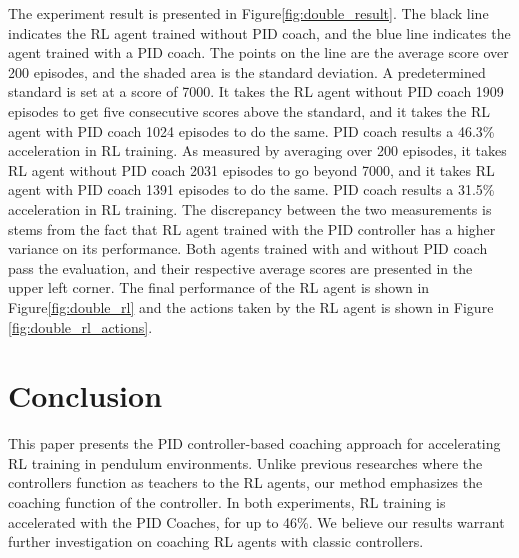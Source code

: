 \documentclass{IJCAS}
\begin{document}
The experiment result is presented in Figure\ref{fig:double_result}. The black line indicates the RL agent trained without PID coach, and the blue line indicates the agent trained with a PID coach. The points on the line are the average score over 200 episodes, and the shaded area is the standard deviation. A predetermined standard is set at a score of 7000. It takes the RL agent without PID coach 1909 episodes to get five consecutive scores above the standard, and it takes the RL agent with PID coach 1024 episodes to do the same. PID coach results a 46.3\% acceleration in RL training. As measured by averaging over 200 episodes, it takes RL agent without PID coach 2031 episodes to go beyond 7000, and it takes RL agent with PID coach 1391 episodes to do the same. PID coach results a 31.5\% acceleration in RL training. The discrepancy between the two measurements is stems from the fact that RL agent trained with the PID controller has a higher variance on its performance. Both agents trained with and without PID coach pass the evaluation, and their respective average scores are presented in the upper left corner. The final performance of the RL agent is shown in Figure\ref{fig:double_rl} and the actions taken by the RL agent is shown in Figure \ref{fig:double_rl_actions}.

\section{Conclusion}

This paper presents the PID controller-based coaching approach for accelerating RL training in pendulum environments. Unlike previous researches where the controllers function as teachers to the RL agents, our method emphasizes the coaching function of the controller. In both experiments, RL training is accelerated with the PID Coaches, for up to 46\%. We believe our results warrant further investigation on coaching RL agents with classic controllers. 




 

\clearafterbiography\relax
\end{document}
